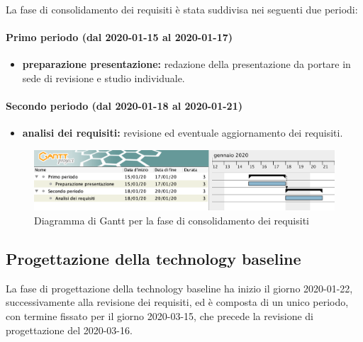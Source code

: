				La fase di consolidamento dei requisiti è stata suddivisa nei seguenti due periodi:
				
				\paragraph{Primo periodo (dal 2020-01-15 al 2020-01-17)}
				
					\begin{itemize}
						\item \textbf{preparazione presentazione:} redazione della presentazione da portare in sede di revisione e studio individuale.
					\end{itemize}
				
				\paragraph{Secondo periodo (dal 2020-01-18 al 2020-01-21)}
				
					\begin{itemize}
						\item \textbf{analisi dei requisiti:} revisione ed eventuale aggiornamento dei requisiti.
					\end{itemize}

		\begin{landscape}

          \begin{figure}[H]
            \centering
            \includegraphics[width=\linewidth]{images/gantt/consolidamentoDeiRequisiti}
            \caption{Diagramma di Gantt per la fase di consolidamento dei requisiti}
          \end{figure}		

		\end{landscape}

		\subsection{Progettazione della technology baseline}
	
			La fase di progettazione della technology baseline ha inizio il giorno 2020-01-22, successivamente alla revisione dei requisiti, ed è composta di un unico periodo, con termine fissato per il giorno 2020-03-15, che precede la revisione di progettazione del 2020-03-16.
			
